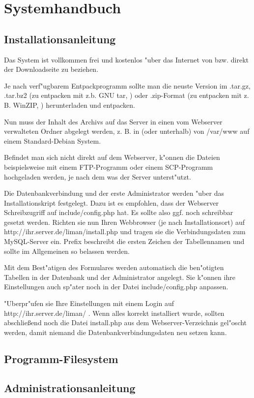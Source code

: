 \chapter{Systemhandbuch}
\section{Installationsanleitung}
Das System ist vollkommen frei und kostenlos "uber das Internet von  
bzw. direkt der 
Downloadseite  
zu beziehen.

Je nach verf"ugbarem Entpackprogramm sollte man die neuste Version im .tar.gz, 
.tar.bz2 (zu entpacken mit z.b. GNU tar, ) oder .zip-Format 
(zu entpacken mit z. B. WinZIP, ) herunterladen und entpacken.

Nun muss der Inhalt des Archivs auf das Server in einen vom Webserver verwalteten Ordner 
abgelegt werden, z. B. in (oder unterhalb) von /var/www auf einem Standard-Debian System.

Befindet man sich nicht direkt auf dem Webserver, k"onnen die Dateien beispielsweise mit 
einem FTP-Programm oder einem SCP-Programm hochgeladen werden, je nach dem was der Server 
unterst"utzt.

Die Datenbankverbindung und der erste Administrator werden "uber das Installationskript 
festgelegt. Dazu ist es empfohlen, dass der Webserver Schreibzugriff auf include/config.php
hat. Es sollte also ggf. noch schreibbar gesetzt werden. Richten sie nun Ihren Webbrowser 
(je nach Installationsort) auf http://ihr.server.de/liman/install.php und tragen sie die 
Verbindungsdaten zum MySQL-Server ein.
Prefix beschreibt die ersten Zeichen der Tabellennamen und sollte im Allgemeinen so belassen
werden.

Mit dem Best"atigen des Formulares werden automatisch die ben"otigten Tabellen in der Datenbank 
und der Administrator angelegt. Sie k"onnen ihre Einstellungen auch sp"ater noch in der Datei
include/config.php anpassen.

"Uberpr"ufen sie Ihre Einstellungen mit einem Login auf http://ihr.server.de/liman/ .
Wenn alles korrekt installiert wurde, sollten abschließend noch die Datei install.php 
aus dem Webserver-Verzeichnis gel"oscht werden, damit niemand die Datenbankverbindungsdaten neu 
setzen kann.

\section{Programm-Filesystem}

\section{Administrationsanleitung}
